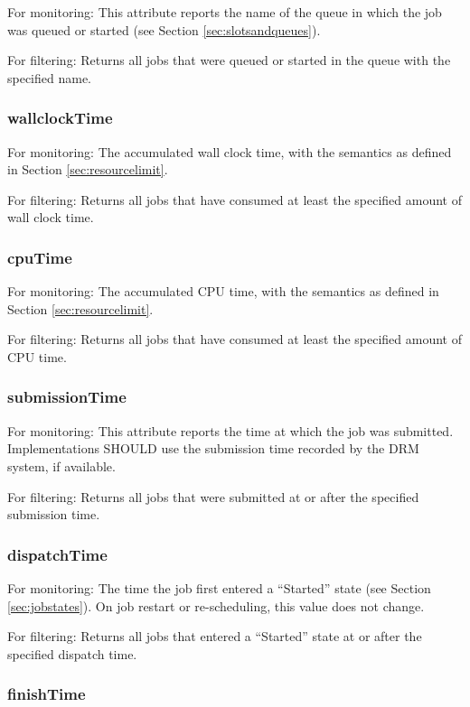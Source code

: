 \documentclass{article}
\begin{document}
For monitoring: This attribute reports the name of the queue in which the job was queued or started (see Section \ref{sec:slotsandqueues}). 

For filtering: Returns all jobs that were queued or started in the queue with the specified name.

\subsubsection{wallclockTime}

For monitoring: The accumulated wall clock time, with the semantics as defined in Section \ref{sec:resourcelimit}.

For filtering: Returns all jobs that have consumed at least the specified amount of wall clock time.

\subsubsection{cpuTime}

For monitoring: The accumulated CPU time, with the semantics as defined in Section \ref{sec:resourcelimit}.

For filtering: Returns all jobs that have consumed at least the specified amount of CPU time.

\subsubsection{submissionTime}

For monitoring: This attribute reports the time at which the job was submitted. Implementations SHOULD use the submission time recorded by the DRM system, if available.

For filtering: Returns all jobs that were submitted at or after the specified submission time.

\subsubsection{dispatchTime}

For monitoring: The time the job first entered a \enquote{Started} state (see Section \ref{sec:jobstates}). On job restart or re-scheduling, this value does not change.

For filtering: Returns all jobs that entered a \enquote{Started} state at or after the specified dispatch time.

\subsubsection{finishTime}
\end{document}
